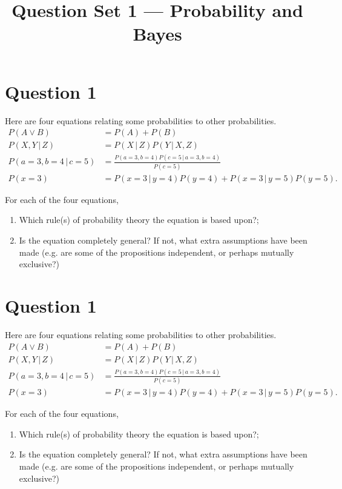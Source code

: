 \documentclass[a4paper, 12pt]{article}
\title{Question Set 1 --- Probability and Bayes}
\author{}
\date{}
\newcommand{\given}{\,|\,}
\begin{document}
\maketitle


\setlength{\parindent}{0pt}
\setlength{\parskip}{8pt}

\section*{Question 1}
Here are four equations relating some probabilities to other probabilities.
\begin{align}
P(A \vee B) &= P(A) + P(B) \\
P(X, Y \given Z) &= P(X \given Z)P(Y \given X, Z) \\
P(a=3, b=4 \given c=5) &= \frac{P(a=3, b=4)P(c = 5 \given a=3, b=4)}
                          {P(c=5)} \\
P(x=3) &= P(x=3 \given y=4)P(y=4) + P(x=3 \given y=5)P(y=5).
\end{align}

For each of the four equations,
\begin{enumerate}
\item Which rule(s) of probability theory the equation is based upon?;
\item Is the equation completely general? If not,
what extra assumptions have been made (e.g. are some of the
propositions independent, or perhaps mutually exclusive?)
\end{enumerate}

\section*{Question 1}
Here are four equations relating some probabilities to other probabilities.
\begin{align}
P(A \vee B) &= P(A) + P(B) \\
P(X, Y \given Z) &= P(X \given Z)P(Y \given X, Z) \\
P(a=3, b=4 \given c=5) &= \frac{P(a=3, b=4)P(c = 5 \given a=3, b=4)}
                          {P(c=5)} \\
P(x=3) &= P(x=3 \given y=4)P(y=4) + P(x=3 \given y=5)P(y=5).
\end{align}

For each of the four equations,
\begin{enumerate}
\item Which rule(s) of probability theory the equation is based upon?;
\item Is the equation completely general? If not,
what extra assumptions have been made (e.g. are some of the
propositions independent, or perhaps mutually exclusive?)
\end{enumerate}
\end{document}
